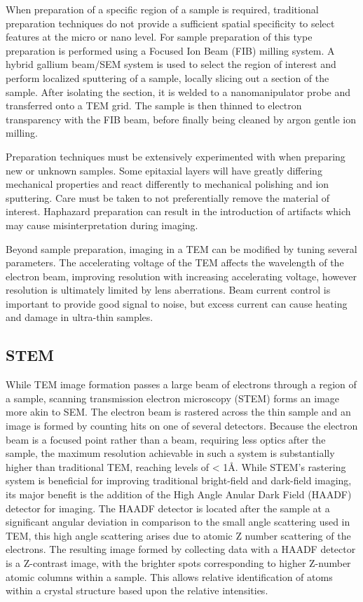 When preparation of a specific region of a sample is required, traditional preparation techniques do not provide a sufficient spatial specificity to select features at the micro or nano level. For sample preparation of this type preparation is performed using a Focused Ion Beam (FIB) milling system. A hybrid gallium beam/SEM system is used to select the region of interest and perform localized sputtering of a sample, locally slicing out a section of the sample. After isolating the section, it is welded to a nanomanipulator probe and transferred onto a TEM grid. The sample is then thinned to electron transparency with the FIB beam, before finally being cleaned by argon gentle ion milling.

Preparation techniques must be extensively experimented with when preparing new or unknown samples. Some epitaxial layers will have greatly differing mechanical properties and react differently to mechanical polishing and ion sputtering. Care must be taken to not preferentially remove the material of interest. Haphazard preparation can result in the introduction of artifacts which may cause misinterpretation during imaging.

Beyond sample preparation, imaging in a TEM can be modified by tuning several parameters. The accelerating voltage of the TEM affects the wavelength of the electron beam, improving resolution with increasing accelerating voltage, however resolution is ultimately limited by lens aberrations. Beam current control is important to provide good signal to noise, but excess current can cause heating and damage in ultra-thin samples.

\subsection{STEM}
While TEM image formation passes a large beam of electrons through a region of a sample, scanning transmission electron microscopy (STEM) forms an image more akin to SEM. The electron beam is rastered across the thin sample and an image is formed by counting hits on one of several detectors. Because the electron beam is a focused point rather than a beam, requiring less optics after the sample, the maximum resolution achievable in such a system is substantially higher than traditional TEM, reaching levels of < 1\AA{}. While STEM's rastering system is beneficial for improving traditional bright-field and dark-field imaging, its major benefit is the addition of the High Angle Anular Dark Field (HAADF) detector for imaging. The HAADF detector is located after the sample at a significant angular deviation in comparison to the small angle scattering used in TEM, this high angle scattering arises due to atomic Z number scattering of the electrons. The resulting image formed by collecting data with a HAADF detector is a Z-contrast image, with the brighter spots corresponding to higher Z-number atomic columns within a sample. This allows relative identification of atoms within a crystal structure based upon the relative intensities.

